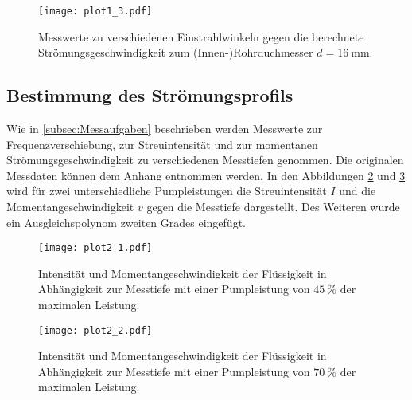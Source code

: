 \begin{figure}
  \centering
  \texttt{[image: plot1\_3.pdf]}
  \caption{Messwerte zu verschiedenen Einstrahlwinkeln gegen die berechnete Strömungsgeschwindigkeit zum (Innen-)Rohrduchmesser $d = \qty{16}{\milli\metre}$.}
  \label{fig:plot1_3}
\end{figure}

\subsection{Bestimmung des Strömungsprofils}
\label{subsec:strömungsprofil}
Wie in \autoref{subsec:Messaufgaben} beschrieben werden Messwerte zur Frequenzverschiebung, zur Streuintensität und zur momentanen Strömungsgeschwindigkeit zu verschiedenen 
Messtiefen genommen. Die originalen Messdaten können dem Anhang entnommen werden.
In den Abbildungen \ref{fig:plot2_1} und \ref{fig:plot2_2} wird für zwei unterschiedliche Pumpleistungen die Streuintensität $I$ und die Momentangeschwindigkeit $v$ gegen die 
Messtiefe dargestellt. Des Weiteren wurde ein Ausgleichspolynom zweiten Grades eingefügt.

\begin{figure}
  \centering
  \texttt{[image: plot2\_1.pdf]}
  \caption{Intensität und Momentangeschwindigkeit der Flüssigkeit in Abhängigkeit zur Messtiefe mit einer Pumpleistung von $\qty{45}{\percent}$ der maximalen Leistung.}
  \label{fig:plot2_1}
\end{figure}

\begin{figure}
  \centering
  \texttt{[image: plot2\_2.pdf]}
  \caption{Intensität und Momentangeschwindigkeit der Flüssigkeit in Abhängigkeit zur Messtiefe mit einer Pumpleistung von $\qty{70}{\percent}$ der maximalen Leistung.}
  \label{fig:plot2_2}
\end{figure}
